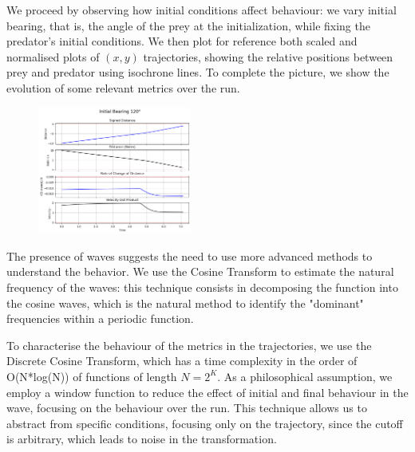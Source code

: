\documentclass[10pt, twocolumn]{article}
\begin{document}
        We proceed by observing how initial conditions affect behaviour: we vary initial bearing, that is, the angle of the prey at the initialization, while fixing the predator's initial conditions. We then plot for reference both scaled and normalised plots of $(x,y)$ trajectories, showing the relative positions between prey and predator using isochrone lines. To complete the picture, we show the evolution of some relevant metrics over the run.

        \begin{figure}[H]
          \centering
          \includegraphics[width=0.45\textwidth]{figures/initial_bearing_120.png}
          \label{fig:bear120}
        \end{figure}

        The presence of waves suggests the need to use more advanced methods to understand the behavior. We use the Cosine Transform to estimate the natural frequency of the waves: this technique consists in decomposing the function into the cosine waves, which is the natural method to identify the "dominant" frequencies within a periodic function.

        To characterise the behaviour of the metrics in the trajectories, we use the Discrete Cosine Transform, which has a time complexity in the order of O(N*log(N)) of functions of length $N = 2^K$. As a philosophical assumption, we employ a window function to reduce the effect of initial and final behaviour in the wave, focusing on the behaviour over the run. This technique allows us to abstract from specific conditions, focusing only on the trajectory, since the cutoff is arbitrary, which leads to noise in the transformation.
\end{document}
